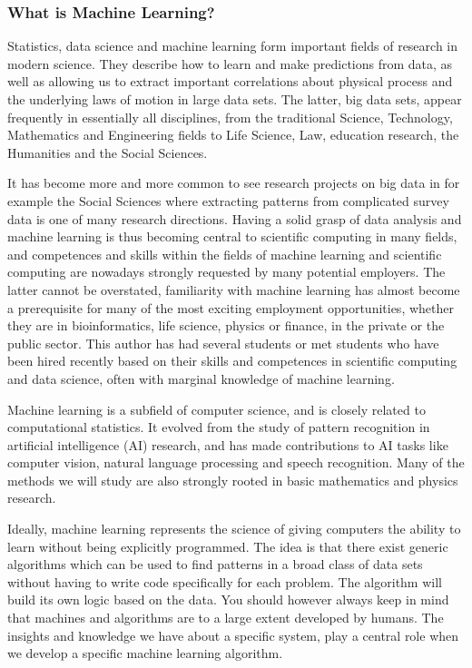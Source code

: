 \documentclass{beamer}
\begin{document}
\begin{frame}
\frametitle{What is Machine Learning?}

Statistics, data science and machine learning form important fields of
research in modern science.  They describe how to learn and make
predictions from data, as well as allowing us to extract important
correlations about physical process and the underlying laws of motion
in large data sets. The latter, big data sets, appear frequently in
essentially all disciplines, from the traditional Science, Technology,
Mathematics and Engineering fields to Life Science, Law, education
research, the Humanities and the Social Sciences. 

It has become more
and more common to see research projects on big data in for example
the Social Sciences where extracting patterns from complicated survey
data is one of many research directions.  Having a solid grasp of data
analysis and machine learning is thus becoming central to scientific
computing in many fields, and competences and skills within the fields
of machine learning and scientific computing are nowadays strongly
requested by many potential employers. The latter cannot be
overstated, familiarity with machine learning has almost become a
prerequisite for many of the most exciting employment opportunities,
whether they are in bioinformatics, life science, physics or finance,
in the private or the public sector. This author has had several
students or met students who have been hired recently based on their
skills and competences in scientific computing and data science, often
with marginal knowledge of machine learning.

Machine learning is a subfield of computer science, and is closely
related to computational statistics.  It evolved from the study of
pattern recognition in artificial intelligence (AI) research, and has
made contributions to AI tasks like computer vision, natural language
processing and speech recognition. Many of the methods we will study are also 
strongly rooted in basic mathematics and physics research. 

Ideally, machine learning represents the science of giving computers
the ability to learn without being explicitly programmed.  The idea is
that there exist generic algorithms which can be used to find patterns
in a broad class of data sets without having to write code
specifically for each problem. The algorithm will build its own logic
based on the data.  You should however always keep in mind that
machines and algorithms are to a large extent developed by humans. The
insights and knowledge we have about a specific system, play a central
role when we develop a specific machine learning algorithm. 


\end{frame}
\end{document}
